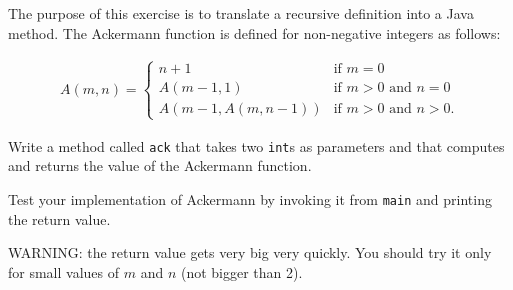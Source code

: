 \documentclass[12pt]{book}
\begin{document}
\begin{exercise}
The purpose of this exercise is to translate a recursive definition into a Java method.
The Ackermann function is defined for non-negative integers as follows:

\begin{eqnarray}
A(m, n) = \begin{cases}
              n+1 & \mbox{if } m = 0 \\
        A(m-1, 1) & \mbox{if } m > 0 \mbox{ and } n = 0 \\
A(m-1, A(m, n-1)) & \mbox{if } m > 0 \mbox{ and } n > 0.
\end{cases}
\end{eqnarray}

Write a method called {\tt ack} that takes two {\tt int}s as parameters and that computes and returns the value of the Ackermann function.

Test your implementation of Ackermann by invoking it from {\tt main} and printing the return value.

WARNING: the return value gets very big very quickly.
You should try it only for small values of $m$ and $n$ (not bigger than 2).
\end{exercise}
\end{document}

